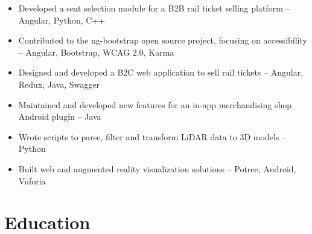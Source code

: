 \documentclass[11pt,a4paper,sans]{moderncv} %
\begin{document}
{\begin{itemize}
    \item Developed a seat selection module for a B2B rail ticket selling platform  -- Angular, Python, C++
    \item Contributed to the ng-bootstrap open source project, focusing on accessibility -- Angular, Bootstrap, WCAG 2.0, Karma
    \item Designed and developed a B2C web application to sell rail tickets -- Angular, Redux, Java, Swagger
\end{itemize}}

{\begin{itemize}
    \item Maintained and developed new features for an in-app merchandising shop Android plugin -- Java
\end{itemize}}

{\begin{itemize}
    \item Wrote scripts to parse, filter and transform LiDAR data to 3D models -- Python
    \item Built web and augmented reality visualization solutions -- Potree, Android, Vuforia
\end{itemize}}

\section{Education}

\end{document}
